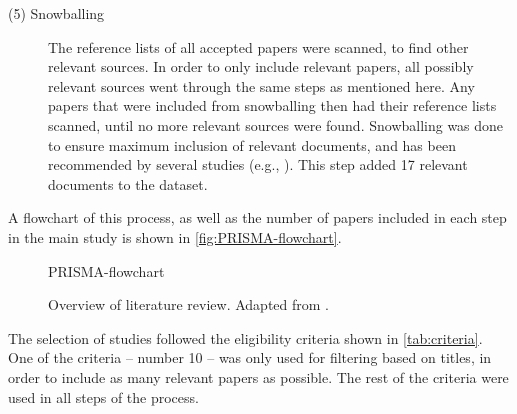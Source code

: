 \begin{description}
    \item[\textnormal{(5)} Snowballing] The reference lists of all accepted papers were scanned, to find other relevant sources. In order to only include relevant papers, all possibly relevant sources went through the same steps as mentioned here. Any papers that were included from snowballing then had their reference lists scanned, until no more relevant sources were found. Snowballing was done to ensure maximum inclusion of relevant documents, and has been recommended by several studies (e.g., \cite{Greenhalgh_2005,Wohlin_2014}). This step added 17 relevant documents to the dataset.
\end{description}

A flowchart of this process, as well as the number of papers included in each step in the main study is shown in \autoref{fig:PRISMA-flowchart}.

\begin{figure}[p]
    \centering
    {PRISMA-flowchart}
    \caption[Overview of literature review]{Overview of literature review. Adapted from \textcite{PRISMA_2022}.}
    \label{fig:PRISMA-flowchart}
\end{figure}

The selection of studies followed the eligibility criteria shown in \autoref{tab:criteria}. One of the criteria -- number 10 -- was only used for filtering based on titles, in order to include as many relevant papers as possible. The rest of the criteria were used in all steps of the process.

